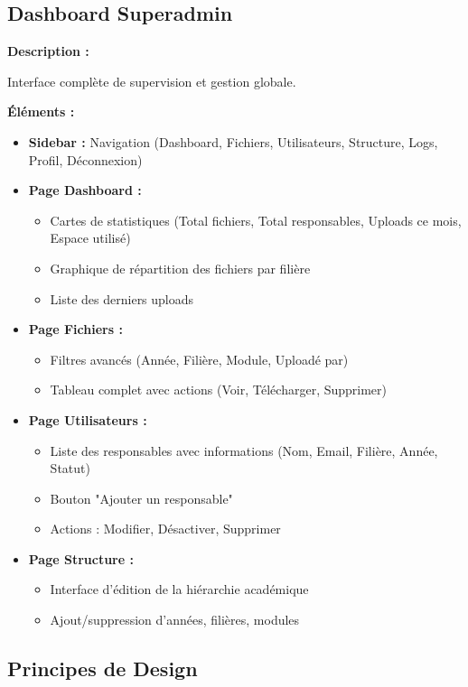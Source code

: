 \documentclass[12pt,a4paper]{article}
\begin{document}
\subsection{Dashboard Superadmin}

\textbf{Description :}

Interface complète de supervision et gestion globale.

\textbf{Éléments :}
\begin{itemize}[leftmargin=*]
    \item \textbf{Sidebar :} Navigation (Dashboard, Fichiers, Utilisateurs, Structure, Logs, Profil, Déconnexion)
    \item \textbf{Page Dashboard :}
    \begin{itemize}
        \item Cartes de statistiques (Total fichiers, Total responsables, Uploads ce mois, Espace utilisé)
        \item Graphique de répartition des fichiers par filière
        \item Liste des derniers uploads
    \end{itemize}
    \item \textbf{Page Fichiers :}
    \begin{itemize}
        \item Filtres avancés (Année, Filière, Module, Uploadé par)
        \item Tableau complet avec actions (Voir, Télécharger, Supprimer)
    \end{itemize}
    \item \textbf{Page Utilisateurs :}
    \begin{itemize}
        \item Liste des responsables avec informations (Nom, Email, Filière, Année, Statut)
        \item Bouton "Ajouter un responsable"
        \item Actions : Modifier, Désactiver, Supprimer
    \end{itemize}
    \item \textbf{Page Structure :}
    \begin{itemize}
        \item Interface d'édition de la hiérarchie académique
        \item Ajout/suppression d'années, filières, modules
    \end{itemize}
\end{itemize}

\subsection{Principes de Design}
\end{document}
